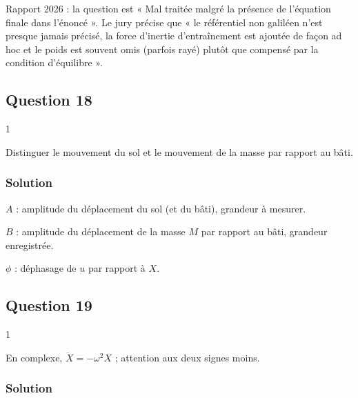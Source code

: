 \documentclass[11pt,a4paper]{article}
\begin{document}
\begin{jury}

Rapport 2026 : la question est « Mal traitée malgré la présence de l'équation finale dans l'énoncé ». Le jury précise que « le référentiel non galiléen n'est presque jamais précisé, la force d'inertie d'entraînement est ajoutée de façon ad hoc et le poids est souvent omis (parfois rayé) plutôt que compensé par la condition d'équilibre ».

\end{jury}

\hypertarget{question-18}{%
\subsection{Question 18}\label{question-18}}

\begin{indication}{1}

Distinguer le mouvement du sol et le mouvement de la masse par rapport au bâti.

\end{indication}

\hypertarget{solution-17}{%
\subsubsection{Solution}\label{solution-17}}

\(A\) : amplitude du déplacement du sol (et du bâti), grandeur à mesurer.

\(B\) : amplitude du déplacement de la masse \(M\) par rapport au bâti, grandeur enregistrée.

\(\phi\) : déphasage de \(u\) par rapport à \(X\).

\hypertarget{question-19}{%
\subsection{Question 19}\label{question-19}}

\begin{indication}{1}

En complexe, \(\ddot X=-\omega^2X\) ; attention aux deux signes moins.

\end{indication}

\hypertarget{solution-18}{%
\subsubsection{Solution}\label{solution-18}}
\end{document}
